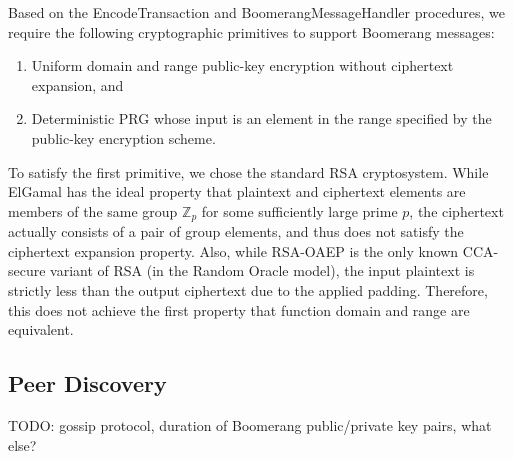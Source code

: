 
Based on the {\sf EncodeTransaction} and {\sf BoomerangMessageHandler} procedures, we require the following cryptographic primitives to support Boomerang messages:
\begin{enumerate}
	\item Uniform domain and range public-key encryption without ciphertext expansion, and
	\item Deterministic PRG whose input is an element in the range specified by the public-key encryption scheme.
\end{enumerate}

To satisfy the first primitive, we chose the standard RSA cryptosystem. While ElGamal has the ideal property that plaintext and ciphertext elements are members of the same group $\mathbb{Z}_p$ for some sufficiently large prime $p$, the ciphertext actually consists of a pair of group elements, and thus does not satisfy the ciphertext expansion property. Also, while RSA-OAEP is the only known CCA-secure variant of RSA (in the Random Oracle model), the input plaintext is strictly less than the output ciphertext due to the applied padding. Therefore, this does not achieve the first property that function domain and range are equivalent. 





\subsection{Peer Discovery}
TODO: gossip protocol, duration of Boomerang public/private key pairs, what else?

